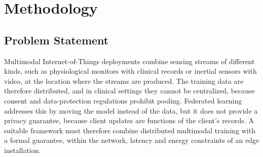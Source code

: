 %
%

\section{Methodology}
\label{sec:method}

\subsection{Problem Statement}
\label{sec:method:problem}

Multimodal Internet-of-Things deployments combine sensing streams of different
kinds, such as physiological monitors with clinical records or inertial sensors
with video, at the location where the streams are produced. The training data
are therefore distributed, and in clinical settings they cannot be centralized,
because consent and data-protection regulations prohibit pooling. Federated
learning addresses this by moving the model instead of the data, but it does
not provide a privacy guarantee, because client updates are functions of the
client's records. A suitable framework must therefore combine distributed
multimodal training with a formal guarantee, within the network, latency and
energy constraints of an edge installation.

